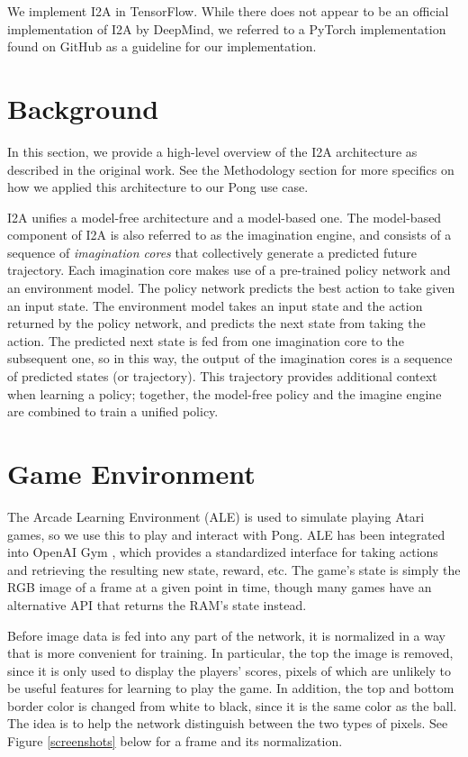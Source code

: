 \documentclass[10pt, twocolumn]{article}
\begin{document}
We implement I2A in TensorFlow. While there does not appear to be an official implementation of I2A by DeepMind, we referred to a PyTorch implementation found on GitHub \cite{} as a guideline for our implementation.

\section{Background}

In this section, we provide a high-level overview of the I2A architecture as described in the original work. See the Methodology section for more specifics on how we applied this architecture to our Pong use case.

I2A unifies a model-free 
architecture and a model-based one. The model-based component of I2A is also referred to as the imagination engine, and consists of a 
sequence of \emph{imagination cores} that collectively generate a predicted future trajectory. Each imagination core makes use of a pre-trained policy network and an environment model. The policy network predicts the best action to take given an input state. The environment model takes an input state and the action returned by the policy network, and predicts the next state from taking the action. The predicted next state is fed from one imagination core to the subsequent one, so in this way, the output of the imagination cores is a sequence of predicted states (or trajectory). This trajectory provides additional context when learning a policy; together, the model-free policy and the imagine engine are combined to train a unified policy.

\section{Game Environment}
The Arcade Learning Environment (ALE) is used to simulate playing Atari games, so we use this to play and interact with
Pong. ALE has been integrated into OpenAI Gym \cite{openai}, which provides a standardized interface for taking actions
and retrieving the resulting new state, reward, etc. The game's state is simply the RGB image of a frame at a given point in time,
though many games have an alternative API that returns the RAM's state instead.

Before image data is fed into any part of the network, it is normalized in a way that is more convenient for training.
In particular, the top the image is removed, since it is only used to display the players' scores, pixels of which are
unlikely to be useful features for learning to play the game. In addition, the top and bottom border color is changed from
white to black, since it is the same color as the ball. The idea is to help the network distinguish between the two types of pixels.
See Figure \ref{screenshots} below for a frame and its normalization.
\end{document}
